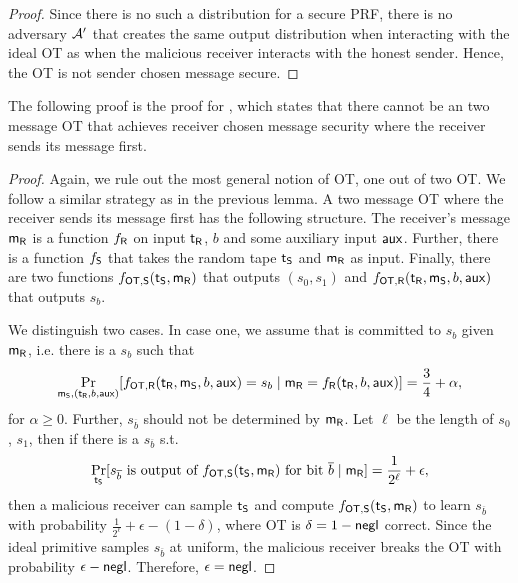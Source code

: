 \begin{proof}
Since there is no such a distribution for a secure PRF, there is no adversary $\mathcal{A}'$ that creates the same output distribution when interacting with the ideal OT as when the malicious receiver interacts with the honest sender. Hence, the OT is not sender chosen message secure. 
\pe
\end{proof}

The following proof is the proof for , which states that there cannot be an two message OT that achieves receiver chosen message security where the receiver sends its message first.

\begin{proof}
Again, we rule out the most general notion of OT, one out of two OT. We follow a similar strategy as in the previous lemma.
A two message OT where the receiver sends its message first has the following structure. The receiver's message $\mathsf{m}_{\mathsf{R}}$ is a function $f_{\mathsf{R}}$ on input $\mathsf{t}_{\mathsf{R}}$, $b$ and some auxiliary input $\mathsf{aux}$. Further, there is a function $f_{\mathsf{S}}$ that takes the random tape $\mathsf{t}_{\mathsf{S}}$ and $\mathsf{m}_{\mathsf{R}}$ as input. Finally, there are two functions $f_{\mathsf{OT},\mathsf{S}}(\mathsf{t}_{\mathsf{S}},\mathsf{m}_{\mathsf{R}})$ that outputs $(s_0,s_1)$ and $f_{\mathsf{OT},\mathsf{R}}(\mathsf{t}_{\mathsf{R}},\mathsf{m}_{\mathsf{S}},b,\mathsf{aux})$ that outputs $s_b$. 

We distinguish two cases. In case one,  we assume that \rec is committed to $s_b$ given $\mathsf{m}_{\mathsf{R}}$, i.e. there is a $s_b$ such that
$$
\Pr_{\mathsf{m}_{\mathsf{S}}, (\mathsf{t}_{\mathsf{R}},b,\mathsf{aux})}[f_{\mathsf{OT},\mathsf{R}}(\mathsf{t}_{\mathsf{R}},\mathsf{m}_{\mathsf{S}},b,\mathsf{aux})=s_b\mid \mathsf{m}_{\mathsf{R}}=f_{\mathsf{R}}(\mathsf{t}_{\mathsf{R}},b,\mathsf{aux})]=\frac{3}{4}+\alpha,
$$
for $\alpha\geq 0$.
Further, $s_{\overline b}$ should not be determined by $\mathsf{m}_{\mathsf{R}}$. Let $\ell$ be the length of $s_0$, $s_1$, then if there is a $s_{\overline b}$ s.t. 
$$
\Pr_{\mathsf{t}_{\mathsf{S}}}[s_{\overline b}\text{ is output of }f_{\mathsf{OT},\mathsf{S}}(\mathsf{t}_{\mathsf{S}},\mathsf{m}_{\mathsf{R}})\text{ for bit }\overline b\mid \mathsf{m}_{\mathsf{R}}]=\frac{1}{2^\ell}+\epsilon,
$$
then a malicious receiver can sample $\mathsf{t}_{\mathsf{S}}$ and compute $f_{\mathsf{OT},\mathsf{S}}(\mathsf{t}_{\mathsf{S}},\mathsf{m}_{\mathsf{R}})$ to learn $s_{\overline b}$ with probability $\frac{1}{2^\ell}+\epsilon-(1-\delta)$, where OT is $\delta=1-\mathsf{negl}$ correct. Since the ideal primitive samples $s_{\overline b}$ at uniform, the malicious receiver breaks the OT with probability $\epsilon-\mathsf{negl}$. Therefore, $\epsilon=\mathsf{negl}$. 


\end{proof}
